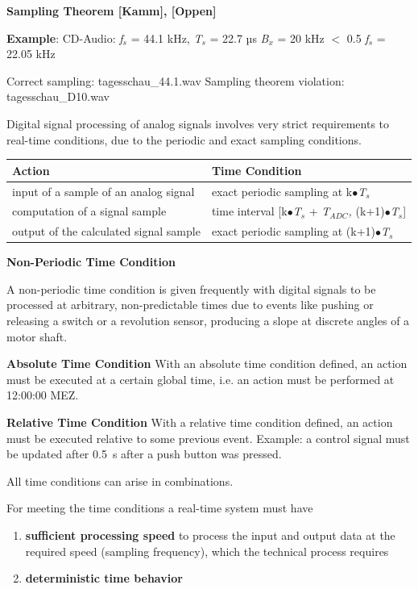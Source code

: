 \textbf{Sampling Theorem [Kamm], [Oppen]}

\textbf{Example}: CD-Audio: \textit{f}${}_{s}$ = 44.1 kHz, \textit{T}${}_{s}$ = 22.7 µs  \textit{B${}_{x}$} = 20 kHz $\mathrm{<}$ 0.5 \textit{f}${}_{s}$ = 22.05 kHz 

Correct sampling:       tagesschau\_44.1.wav    Sampling theorem violation:  tagesschau\_D10.wav

Digital signal processing of analog signals involves very strict requirements to real-time conditions, due to the periodic and exact sampling conditions.

\begin{tabular}{|p{2.2in}|p{1.9in}|} \hline 
\textbf{Action} & \textbf{Time Condition} \\ \hline 
input of a sample of an analog signal    & exact periodic sampling at  k$\mathrm{\bullet}$\textit{T}${}_{s}$ \\ \hline 
computation of a signal sample  & time interval [k$\mathrm{\bullet}$\textit{T}${}_{s}$ + \textit{T${}_{ADC}$,} (k+1)$\mathrm{\bullet}$\textit{T}${}_{s}$] \\ \hline 
output of the calculated signal sample & exact periodic sampling at  (k+1)$\mathrm{\bullet}$\textit{T}${}_{s}$ \\ \hline 
\end{tabular}

\textbf{ Non-Periodic Time Condition}

A non-periodic time condition is given frequently with digital signals to be processed at arbitrary, non-predictable times due to events like pushing or releasing a switch or a revolution sensor, producing a slope at discrete angles of a motor shaft.

\textbf{Absolute Time Condition }With an absolute time condition defined, an action must be executed at a certain global time, i.e. an action must be performed at 12:00:00 MEZ.

\textbf{Relative Time Condition }With a relative time condition defined, an action must be executed relative to some previous event. Example: a control signal must be updated after 0.5~s after a push button was pressed.

All time conditions can arise in combinations.

For meeting the time conditions a real-time system must have

\begin{enumerate}
	\item  \textbf{sufficient processing speed} to process the input and output data at the required speed (sampling frequency), which the technical process requires
	\item  \textbf{deterministic time behavior}
\end{enumerate}

